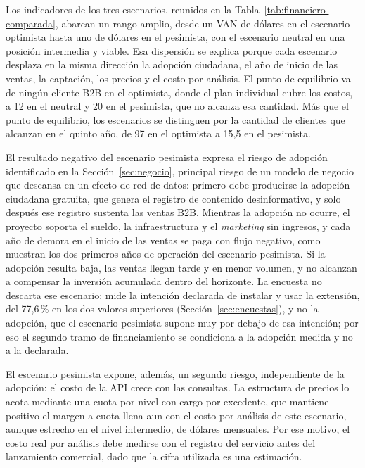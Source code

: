 Los indicadores de los tres escenarios, reunidos en la Tabla~\ref{tab:financiero-comparada}, abarcan un rango amplio, desde un VAN de \finOptVan{} dólares en el escenario optimista hasta uno de \finPesVan{} dólares en el pesimista, con el escenario neutral en una posición intermedia y viable. Esa dispersión se explica porque cada escenario desplaza en la misma dirección la adopción ciudadana, el año de inicio de las ventas, la captación, los precios y el costo por análisis. El punto de equilibrio va de ningún cliente B2B en el optimista, donde el plan individual cubre los costos, a 12 en el neutral y 20 en el pesimista, que no alcanza esa cantidad. Más que el punto de equilibrio, los escenarios se distinguen por la cantidad de clientes que alcanzan en el quinto año, de 97 en el optimista a 15,5 en el pesimista.



El resultado negativo del escenario pesimista expresa el riesgo de adopción identificado en la Sección~\ref{sec:negocio}, principal riesgo de un modelo de negocio que descansa en un efecto de red de datos: primero debe producirse la adopción ciudadana gratuita, que genera el registro de contenido desinformativo, y solo después ese registro sustenta las ventas B2B. Mientras la adopción no ocurre, el proyecto soporta el sueldo, la infraestructura y el \textit{marketing} sin ingresos, y cada año de demora en el inicio de las ventas se paga con flujo negativo, como muestran los dos primeros años de operación del escenario pesimista. Si la adopción resulta baja, las ventas llegan tarde y en menor volumen, y no alcanzan a compensar la inversión acumulada dentro del horizonte. La encuesta no descarta ese escenario: mide la intención declarada de instalar y usar la extensión, del 77,6\,\% en los dos valores superiores (Sección~\ref{sec:encuestas}), y no la adopción, que el escenario pesimista supone muy por debajo de esa intención; por eso el segundo tramo de financiamiento se condiciona a la adopción medida y no a la declarada.

El escenario pesimista expone, además, un segundo riesgo, independiente de la adopción: el costo de la API crece con las consultas. La estructura de precios lo acota mediante una cuota por nivel con cargo por excedente, que mantiene positivo el margen a cuota llena aun con el costo por análisis de este escenario, aunque estrecho en el nivel intermedio, de \finMargenIntermediaPes{} dólares mensuales. Por ese motivo, el costo real por análisis debe medirse con el registro del servicio antes del lanzamiento comercial, dado que la cifra utilizada es una estimación.

